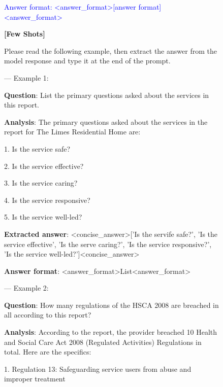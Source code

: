 \begin{figure}[htbp]
\begin{tcolorbox}[title=The answer extracting prompt used to make long response concise during evaluation,colback=gray!5,colframe=gray!75!gray]
{\textcolor{blue}{Answer format: <answer\_format>[answer format]<\/answer\_format>}

\vspace{0.2cm}

\textbf{[Few Shots]}

Please read the following example, then extract the answer from the model response and type it at the end of the prompt. 

\vspace{0.2cm}

--- Example 1:

\textbf{Question}: List the primary questions asked about the services in this report.

\textbf{Analysis}: The primary questions asked about the services in the report for The Limes Residential Home are: 

1. Is the service safe?

2. Is the service effective?

3. Is the service caring?

4. Is the service responsive?

5. Is the service well-led? 

\textbf{Extracted answer}: <concise\_answer>['Is the servife safe?', 'Is the service effective', 'Is the serve caring?', 'Is the service responsive?', 'Is the service well-led?']<\/concise\_answer>

\textbf{Answer format}: <answer\_format>List<\/answer\_format>

\vspace{0.2cm}

--- Example 2:

\textbf{Question}: How many regulations of the HSCA 2008 are breached in all according to this report?

\textbf{Analysis}: According to the report, the provider breached 10 Health and Social Care Act 2008 (Regulated Activities) Regulations in total. Here are the specifics:

1. Regulation 13: Safeguarding service users from abuse and improper treatment

}
\end{tcolorbox}
\end{figure}
